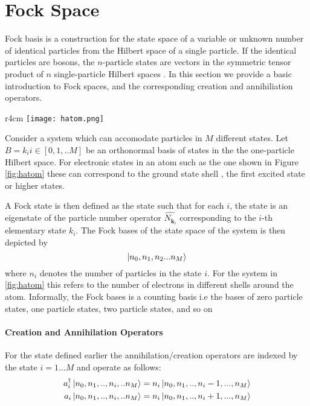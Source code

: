 \appendix

\setcounter{thm}{0}

\onecolumn


\section{Fock Space}
\label{apx:fock}
Fock basis is a construction for the state space of a variable or unknown number of identical particles from the Hilbert space of a single particle. If the identical particles are bosons, the $n$-particle states are vectors in the symmetric tensor product of $n$ single-particle Hilbert spaces \citep{fock_wiki}. In this section we provide a basic introduction to Fock spaces, and the corresponding creation and annihiliation operators. 

\begin{wrapfigure}{r}{4cm}
\vspace{-0.3cm}
\captionsetup{type=figure}
    \centering
    \texttt{[image: hatom.png]}
    \caption{Configuration Space of an Atom \label{fig:hatom} }
\end{wrapfigure}

Consider a system which can accomodate particles in $M$ different states. Let $B = {k_i} i \in [0,1,..M]$ be an orthonormal basis of states in the the one-particle Hilbert space. For electronic states in an atom such as the one shown in Figure \ref{fig:hatom} these can correspond to the ground state shell , the first excited state or higher states. 

A Fock state is then defined as the state such that for each $i$, the state is an eigenstate of the particle number operator $ \widehat {N_{{\mathbf {k} }_{i}}}$ corresponding to the $i$-th elementary state $k_i$. The Fock bases of the state space of the system is then depicted by
$$\ket{n_0,n_1,n_2...n_M}$$
where $n_i$ denotes the number of particles in the state $i$. For the system in \ref{fig:hatom}  this refers to the number of electrons in different shells around the atom. Informally, the Fock bases is a counting basis i.e the bases of zero particle states, one particle states, two particle states, and so on



\paragraph{Creation and Annihilation Operators}
For the state defined earlier the  annihilation/creation operators are indexed by the state $i=1...M$ and operate as follows:
\begin{align*}
    a_i^\dagger \ket{n_0,n_1,..,n_i,..n_M} = n_i \ket{n_0,n_1,..,n_i-1,...,n_M} \\
    a_i \ket{n_0,n_1,..,n_i,..n_M} = n_i \ket{n_0,n_1,..,n_i+1,...,n_M} \\
\end{align*}


